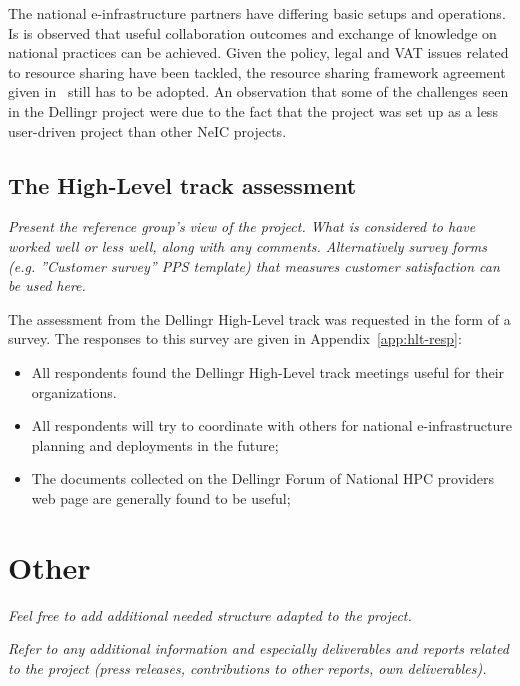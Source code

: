 \documentclass{article}
\newcommand{\dell}{Dellingr\xspace}
\newcommand{\einfra}{e-infrastructure\xspace}
\newcommand{\HLT}{High-Level track\xspace}
\begin{document}
The national \einfra partners have differing basic setups and operations.
Is is observed that useful collaboration outcomes and exchange of knowledge on national practices can be achieved.
Given the policy, legal and VAT issues related to resource sharing have been tackled, the resource sharing
framework agreement given in~\cite{dellingr-p2-do5} still has to be adopted.
An observation that some of the challenges seen in the \dell project were due to the fact that the project was set up
as a less user-driven project than other NeIC projects.

\subsection{The \HLT assessment}
{\it Present the reference group’s view of the project. What is considered to have worked well or less well, along with any comments.  Alternatively survey forms (e.g. ”Customer survey” PPS template) that measures customer satisfaction can be used here.}

The assessment from the \dell \HLT was requested in the form of a survey.
The responses to this survey are given in Appendix~\ref{app:hlt-resp}:
\begin{itemize}
\item All respondents found the \dell \HLT meetings useful for their organizations.
\item All respondents will try to coordinate with others for national \einfra planning and deployments in the future;
\item The documents collected on the \dell Forum of National HPC providers web page are generally found to be useful;
\end{itemize}

\section{Other}

{\it Feel free to add additional needed structure adapted to the project.}

\newpage
{\it Refer to any additional information and especially deliverables and reports related to the project (press releases, contributions to other reports, own deliverables).}
{}

\end{document}
